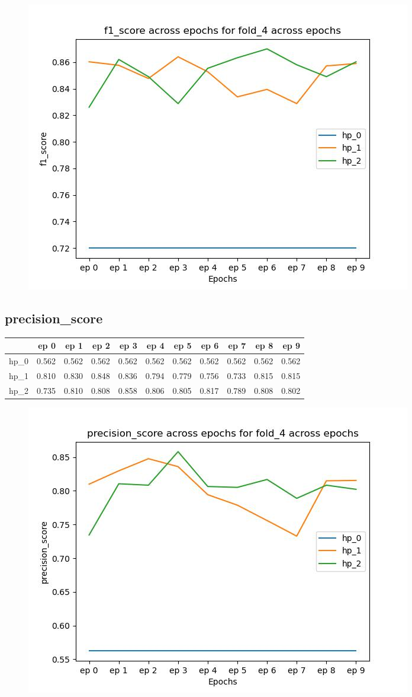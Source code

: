 \documentclass{article}
\begin{document}
\begin{figure}[H]
\includegraphics[scale = 0.75]{fold_4/f1_score}
\end{figure}
\subsection{precision\_score}
\begin{tabular}{lrrrrrrrrrr}
\toprule
{} &   ep 0 &   ep 1 &   ep 2 &   ep 3 &   ep 4 &   ep 5 &   ep 6 &   ep 7 &   ep 8 &   ep 9 \\
\midrule
hp\_0 &  0.562 &  0.562 &  0.562 &  0.562 &  0.562 &  0.562 &  0.562 &  0.562 &  0.562 &  0.562 \\
hp\_1 &  0.810 &  0.830 &  0.848 &  0.836 &  0.794 &  0.779 &  0.756 &  0.733 &  0.815 &  0.815 \\
hp\_2 &  0.735 &  0.810 &  0.808 &  0.858 &  0.806 &  0.805 &  0.817 &  0.789 &  0.808 &  0.802 \\
\bottomrule
\end{tabular}

\begin{figure}[H]
\includegraphics[scale = 0.75]{fold_4/precision_score}
\end{figure}
\end{document}
